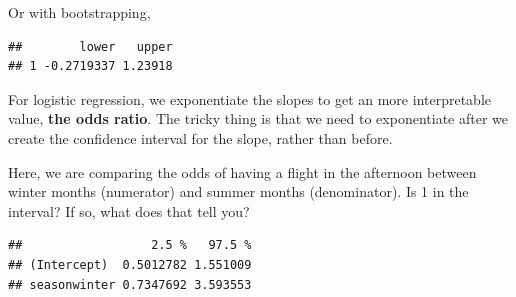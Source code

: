 \documentclass[
]{book}
\newenvironment{Shaded}{\begin{snugshade}}{\end{snugshade}}
\newcommand{\CommentTok}[1]{\textcolor[rgb]{0.56,0.35,0.01}{\textit{#1}}}
\newcommand{\DataTypeTok}[1]{\textcolor[rgb]{0.13,0.29,0.53}{#1}}
\newcommand{\DecValTok}[1]{\textcolor[rgb]{0.00,0.00,0.81}{#1}}
\newcommand{\FloatTok}[1]{\textcolor[rgb]{0.00,0.00,0.81}{#1}}
\newcommand{\KeywordTok}[1]{\textcolor[rgb]{0.13,0.29,0.53}{\textbf{#1}}}
\newcommand{\NormalTok}[1]{#1}
\newcommand{\OperatorTok}[1]{\textcolor[rgb]{0.81,0.36,0.00}{\textbf{#1}}}
\newcommand{\OtherTok}[1]{\textcolor[rgb]{0.56,0.35,0.01}{#1}}
\newcommand{\StringTok}[1]{\textcolor[rgb]{0.31,0.60,0.02}{#1}}
\begin{document}
Or with bootstrapping,

\begin{Shaded}
\end{Shaded}

\begin{verbatim}
##        lower   upper
## 1 -0.2719337 1.23918
\end{verbatim}

For logistic regression, we exponentiate the slopes to get an more interpretable value, \textbf{the odds ratio}. The tricky thing is that we need to exponentiate after we create the confidence interval for the slope, rather than before.

Here, we are comparing the odds of having a flight in the afternoon between winter months (numerator) and summer months (denominator). Is 1 in the interval? If so, what does that tell you?

\begin{Shaded}
\end{Shaded}

\begin{verbatim}
##                  2.5 %   97.5 %
## (Intercept)  0.5012782 1.551009
## seasonwinter 0.7347692 3.593553
\end{verbatim}
\end{document}
